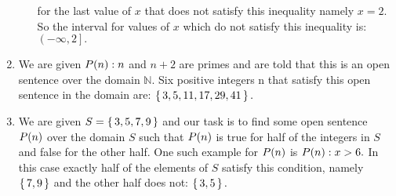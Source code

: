 \documentclass[12pt]{article}
\makeatletter
\newcommand*{\arabicodd}[1]{%
  \expandafter\@arabicodd\csname c@#1\endcsname
}
\newcommand*{\@arabicodd}[1]{%
  \@arabic{\numexpr(#1)*2-1\relax}%
}
\makeatother
\begin{document}
\begin{enumerate}[label=2.\arabicodd*]
\begin{enumerate}[label=(\alph*)]
            for the last value of $x$ that does not satisfy this inequality
            namely $x=2.$ So the interval for values of $x$ which do not satisfy
            this inequality is: $\left(-\infty, 2\right].$
      \end{enumerate}
    \item We are given $P\qty(n): n$ and $n+2$ are primes and are told that this
          is an open sentence over the domain $\mathbb{N}.$ Six positive integers
          n that satisfy this open sentence in the domain are: $\set{3,5,11,17,29,41}.$
    \item We are given $S = \set{3,5,7,9}$ and our task is to find some open sentence
          $P\qty(n)$ over the domain $S$ such that $P\qty(n)$ is true for half
          of the integers in $S$ and false for the other half. One such example
          for $P\qty(n)$ is $P\qty(n) : x > 6.$ In this case exactly half of
          the elements of $S$ satisfy this condition, namely $\set{7,9}$ and
          the other half does not: $\set{3,5}.$
  \end{enumerate}
\end{document}
